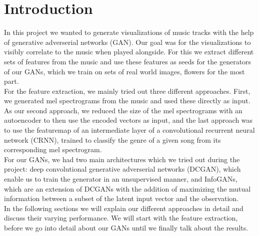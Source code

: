 \chapter{Introduction}
  In this project we wanted to generate visualizations of music tracks with the help of generative adverserial networks (GAN). 
  Our goal was for the visualizations to visibly correlate to the music when played alongside.
  For this we extract different sets of features from the music and use these features as seeds for the generators of our GANs, which we train on sets of real world images, flowers for the most part.\\
  For the feature extraction, we mainly tried out three different approaches. First, we generated mel spectrograms from the music and used these directly as input. 
  As our second approach, we reduced the size of the mel spectrograms with an autoencoder to then use the encoded vectors as input, and the last approach was to use the featuremap of an intermediate layer of a convolutional recurrent neural network (CRNN), trained to classify the genre of a given song from its corresponding mel spectrogram.\\
  For our GANs, we had two main architectures which we tried out during the project: deep convolutional generative adverserial networks (DCGAN), which enable us to train the generator in an unsupervised manner, and InfoGANs, which are an extension of DCGANs with the addition of maximizing
  the mutual information between a subset of the latent input vector and the observation.\\
  In the following sections we will explain our different approaches in detail and discuss their varying performance. We will start with the feature extraction, before we go into detail about our GANs until we finally talk about the results.

